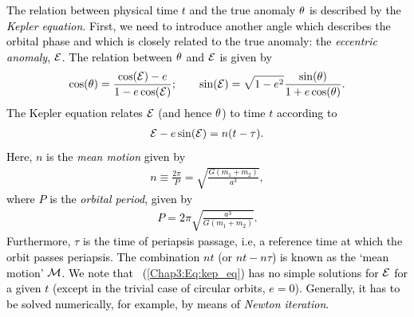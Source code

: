 \documentclass[main.tex]{subfiles}
\begin{document}
\begin{tcolorbox}[sharp corners, colback=blue!30, colframe=blue!80!blue, title=Orbital Dynamics II$^6$ (continued)]
\par \textcolor{black}{The relation between physical time $t$ and the true anomaly $\theta$ is described by the {\it Kepler equation}. First, we need to introduce another angle which describes the orbital phase and which is closely related to the true anomaly: the {\it eccentric anomaly}, $\mathcal{E}$. The relation between $\theta$ and $\mathcal{E}$ is given by
\begin{align}
\label{Chap3:Eq:EA_to_TA}
\cos(\theta) = \frac{\cos(\mathcal{E}) - e}{1 - e \cos(\mathcal{E})}; \qquad \sin(\mathcal{E}) = \sqrt{1-e^2} \frac{\sin(\theta)}{1+e\cos(\theta)}.
\end{align}
The Kepler equation relates $\mathcal{E}$ (and hence $\theta$) to time $t$ according to
\begin{align}
\label{Chap3:Eq:kep_eq}
\mathcal{E} - e \sin(\mathcal{E}) = n(t-\tau).
\end{align}
Here, $n$ is the {\it mean motion} given by
\begin{align}
n \equiv \frac{2\pi}{P} = \sqrt{\frac{G(m_1+m_2)}{a^3}},
\end{align}
where $P$ is the {\it orbital period}, given by
\begin{align}
\label{Chap3:Eq:kepl}
P = 2 \pi \sqrt{\frac{a^3}{G(m_1+m_2)}}.
\end{align}
Furthermore, $\tau$ is the time of periapsis passage, i.e, a reference time at which the orbit passes periapsis. The combination $n t$ (or $nt - n\tau$) is known as the `mean motion' $\mathcal{M}$. We note that \Eq~(\ref{Chap3:Eq:kep_eq}) has no simple solutions for $\mathcal{E}$ for a given $t$ (except in the trivial case of circular orbits, $e=0$). Generally, it has to be solved numerically, for example, by means of {\it Newton iteration}.}
\end{tcolorbox}
\end{document}

